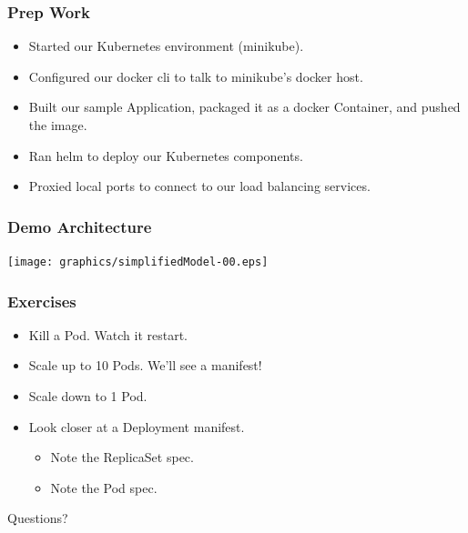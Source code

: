     \begin{frame}
        \frametitle{Prep Work}
        \begin{itemize}
            \item Started our Kubernetes environment (minikube).\pause
            \item Configured our docker cli to talk to minikube's docker host.\pause
            \item Built our sample Application, packaged it as a docker Container, and pushed the image.\pause
            \item Ran helm to deploy our Kubernetes components.\pause
            \item Proxied local ports to connect to our load balancing services.
        \end{itemize}
    \end{frame}

    \begin{frame}
        \frametitle{Demo Architecture}
        \texttt{[image: graphics/simplifiedModel-00.eps]}
    \end{frame}

    \begin{frame}
        \frametitle{Exercises}
        \begin{itemize}
            \item{Kill a Pod. Watch it restart.}
            \item{Scale up to 10 Pods. We'll see a manifest!}
            \item{Scale down to 1 Pod.}
            \item{Look closer at a Deployment manifest.}
            \begin{itemize}
                \item{Note the ReplicaSet spec.}
                \item{Note the Pod spec.}
            \end{itemize}
        \end{itemize}
    \end{frame}

    \begin{frame}
        \begin{center}
            \Huge Questions?
        \end{center}
    \end{frame}

